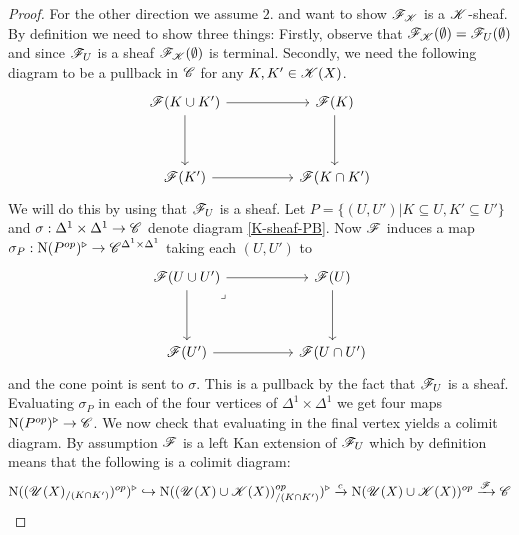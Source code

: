 \documentclass[../../thesis.tex]{subfiles}
\begin{document}
\begin{proof}
    For the other direction we assume $2.$ and want to show $\mathscr{F}_{\mathscr{K}}$ is a $\mathscr{K}$-sheaf. By definition we need to show three things:
    Firstly, observe that $\mathscr{F}_{\mathscr{K}}(\emptyset) = \mathscr{F}_{U}(\emptyset)$ and since $\mathscr{F}_{U}$ is a sheaf $\mathscr{F}_{\mathscr{K}}(\emptyset)$ is terminal.
    Secondly, we need the following diagram to be a pullback in $\mathscr{C}$ for any $K,K' \in \mathscr{K}(X)$.
    \begin{equation}\label{K-sheaf-PB}
        \begin{tikzcd}
            {\F(K \cup K')} && {\F(K)} \\
            \\
            {\F(K')} && {\F(K\cap K')}
            \arrow[from=1-3, to=3-3]
            \arrow[from=3-1, to=3-3]
            \arrow[from=1-1, to=3-1]
            \arrow[from=1-1, to=1-3]
        \end{tikzcd}
    \end{equation}
    We will do this by using that $\mathscr{F}_{U}$ is a sheaf.
    Let $P = \{(U,U') | K \subseteq U, K' \subseteq U'\}$ and $\sigma: \Delta^1\times\Delta^1 \to \mathscr{C}$ denote diagram \ref{K-sheaf-PB}.
    Now $\mathscr{F}$ induces a map $\sigma_P: \mathrm{N}(P^{op})^{\triangleright} \to \mathscr{C}^{\Delta^1\times\Delta^1}$ taking each $(U, U')$ to
    \[
        \begin{tikzcd}
            {\F(U \cup U')} && {\F(U)} \\
            \\
            {\F(U')} && {\F(U\cap U')}
            \arrow[from=1-3, to=3-3]
            \arrow[from=3-1, to=3-3]
            \arrow[from=1-1, to=3-1]
            \arrow["\lrcorner"{anchor=center, pos=0.125}, draw=none, from=1-1, to=3-3]
            \arrow[from=1-1, to=1-3]
        \end{tikzcd}
    \]
    and the cone point is sent to $\sigma$. This is a pullback by the fact that $\mathscr{F}_{U}$ is a sheaf.
    Evaluating $\sigma_P$ in each of the four vertices of $\Delta^1 \times \Delta^1$ we get four maps $\mathrm{N}(P^{op})^{\triangleright} \to \mathscr{C}$.
    We now check that evaluating in the final vertex yields a colimit diagram.
    By assumption $\mathscr{F}$ is a left Kan extension of $\mathscr{F}_{U}$ which by definition means that the following is a colimit diagram:
    \[
        \mathrm{N}((\mathscr{U}(X)_{/(K\cap K')})^{op})^{\triangleright} \hookrightarrow \mathrm{N}((\mathscr{U}(X) \cup \mathscr{K}(X))^{op}_{/(K\cap K')})^{\triangleright} \xrightarrow{c} \mathrm{N}(\mathscr{U}(X) \cup \mathscr{K}(X))^{op} \xrightarrow{\mathscr{F}}\mathscr{C}
\]
\end{proof}
\end{document}
